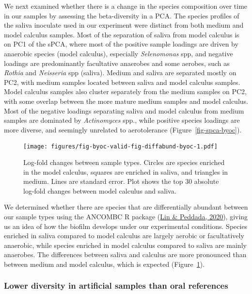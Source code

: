 \documentclass[
  letterpaper,
]{book}
\begin{document}
We next examined whether there is a change in the species composition
over time in our samples by assessing the beta-diversity in a PCA. The
species profiles of the saliva inoculate used in our experiment were
distinct from both medium and model calculus samples. Most of the
separation of saliva from model calculus is on PC1 of the sPCA, where
most of the positive sample loadings are driven by anaerobic species
(model calculus), especially \emph{Selenomonas} spp, and negative
loadings are predominantly facultative anaerobes and some aerobes, such
as \emph{Rothia} and \emph{Neisseria} spp (saliva). Medium and saliva
are separated mostly on PC2, with medium samples located between saliva
and model calculus samples. Model calculus samples also cluster
separately from the medium samples on PC2, with some overlap between the
more mature medium samples and model calculus. Most of the negative
loadings separating saliva and model calculus from medium samples are
dominated by \emph{Actinomyces} spp., while positive species loadings
are more diverse, and seemingly unrelated to aerotolerance
(Figure~\ref{fig-spca-byoc}).

\begin{figure}

{\centering \texttt{[image: figures/fig-byoc-valid-fig-diffabund-byoc-1.pdf]}

}

\caption{\label{fig-diffabund-byoc}Log-fold changes between sample
types. Circles are species enriched in the model calculus, squares are
enriched in saliva, and triangles in medium. Lines are standard error.
Plot shows the top 30 absolute log-fold changes between model calculus
and saliva.}

\end{figure}

We determined whether there are species that are differentially abundant
between our sample types using the ANCOMBC R package
(\protect\hyperlink{ref-linANCOMBC2020}{Lin \& Peddada, 2020}), giving
us an idea of how the biofilm develops under our experimental
conditions. Species enriched in saliva compared to model calculus are
largely aerobic or facultatively anaerobic, while species enriched in
model calculus compared to saliva are mainly anaerobes. The differences
between saliva and calculus are more pronounced than between medium and
model calculus, which is expected (Figure~\ref{fig-diffabund-byoc}).

\hypertarget{lower-diversity-in-artificial-samples-than-oral-references}{%
\subsubsection{Lower diversity in artificial samples than oral
references}\label{lower-diversity-in-artificial-samples-than-oral-references}}
\end{document}
